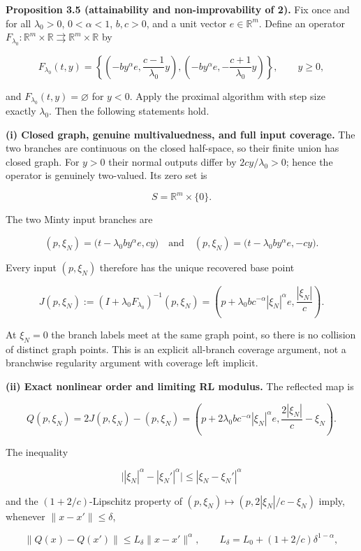 \documentclass[11pt,a4paper]{article}
\theoremstyle{plain}
\theoremstyle{definition}
\theoremstyle{remark}
\begin{document}
\textbf{Proposition 3.5 (attainability and non-improvability of 2).} Fix
once and for all \(\lambda_0>0\), \(0<\alpha<1\), \(b,c>0\), and a unit
vector \(e\in\mathbb R^m\). Define an operator
\(F_{\lambda_0}:\mathbb R^m\times\mathbb R\rightrightarrows\mathbb R^m\times\mathbb R\)
by

\[
F_{\lambda_0}(t,y)=
\left\{
\left(-by^\alpha e,\frac{c-1}{\lambda_0}y\right),
\left(-by^\alpha e,-\frac{c+1}{\lambda_0}y\right)
\right\},\qquad y\ge0,
\tag{3.32}
\]

and \(F_{\lambda_0}(t,y)=\varnothing\) for \(y<0\). Apply the proximal
algorithm with step size exactly \(\lambda_0\). Then the following
statements hold.

\textbf{(i) Closed graph, genuine multivaluedness, and full input
coverage.} The two branches are continuous on the closed half-space, so
their finite union has closed graph. For \(y>0\) their normal outputs
differ by \(2cy/\lambda_0>0\); hence the operator is genuinely
two-valued. Its zero set is

\[
S=\mathbb R^m\times\{0\}.
\]

The two Minty input branches are

\[
(p,\xi_N)=\bigl(t-\lambda_0by^\alpha e,cy\bigr)
\quad\text{and}\quad
(p,\xi_N)=\bigl(t-\lambda_0by^\alpha e,-cy\bigr).
\tag{3.33}
\]

Every input \((p,\xi_N)\) therefore has the unique recovered base point

\[
J(p,\xi_N):=(I+\lambda_0F_{\lambda_0})^{-1}(p,\xi_N)
=\left(p+\lambda_0bc^{-\alpha}|\xi_N|^\alpha e,\frac{|\xi_N|}{c}\right).
\tag{3.34}
\]

At \(\xi_N=0\) the branch labels meet at the same graph point, so there
is no collision of distinct graph points. This is an explicit all-branch
coverage argument, not a branchwise regularity argument with coverage
left implicit.

\textbf{(ii) Exact nonlinear order and limiting RL modulus.} The
reflected map is

\[
Q(p,\xi_N)=2J(p,\xi_N)-(p,\xi_N)
=\left(p+2\lambda_0bc^{-\alpha}|\xi_N|^\alpha e,
\frac{2|\xi_N|}{c}-\xi_N\right).
\tag{3.35}
\]

The inequality

\[
\bigl||\xi_N|^\alpha-|\xi_N'|^\alpha\bigr|\le|\xi_N-\xi_N'|^\alpha
\]

and the \((1+2/c)\)-Lipschitz property of
\((p,\xi_N)\mapsto(p,2|\xi_N|/c-\xi_N)\) imply, whenever
\(\|x-x'\|\le\delta\),

\[
\|Q(x)-Q(x')\|
\le L_\delta\|x-x'\|^\alpha,
\qquad
L_\delta=L_0+(1+2/c)\delta^{1-\alpha},
\tag{3.36}
\]
\end{document}
